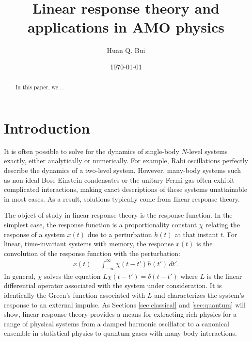\documentclass[reprint,
nofootinbib,
amsmath,amssymb,
aps]{revtex4-1}
\begin{document}
	
	

\title{Linear response theory and applications in AMO physics}
\author{Huan Q. Bui}
\date{\today}


\begin{abstract}
	In this paper, we...
\end{abstract}

\maketitle


\section{Introduction}



It is often possible to solve for the dynamics of single-body $N$-level systems exactly, either analytically or numerically. For example, Rabi oscillations perfectly describe the dynamics of a two-level system. However, many-body systems such as non-ideal Bose-Einstein condensates or the unitary Fermi gas often exhibit complicated interactions, making exact descriptions of these systems unattainable in most cases. As a result, solutions typically come from linear response theory. 

The object of study in linear response theory is the response function. In the simplest case, the response function is a proportionality constant $\chi$ relating the response of a system $x(t)$ due to a perturbation $h(t)$ at that instant $t$. For linear, time-invariant systems with memory, the response $x(t)$ is the convolution of the response function with the perturbation:
\begin{align}\label{eq:linear_response}
x(t) = \int_{-\infty}^{\infty} \chi(t-t') h(t') \,dt'.
\end{align}
In general, $\chi$ solves the equation $ L \chi(t-t') = \delta(t-t')$ where $L$ is the linear differential operator associated with the system under consideration. It is identically the Green's function associated with $L$ and characterizes the system's response to an external impulse. As Sections \ref{sec:classical} and \ref{sec:quantum} will show, linear response theory provides a means for extracting rich physics for a range of physical systems from a damped harmonic oscillator to a canonical ensemble in statistical physics to quantum gases with many-body interactions. 
\end{document}
